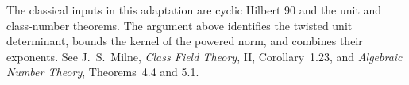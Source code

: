 The classical inputs in this adaptation are cyclic Hilbert 90 and
the unit and class-number theorems. The argument above identifies the
twisted unit determinant, bounds the kernel of the powered norm, and
combines their exponents. See J.~S.~Milne, \emph{Class Field Theory},
II, Corollary~1.23, and \emph{Algebraic Number Theory}, Theorems~4.4
and 5.1. \cite{r21-cft}\quad
\cite{r21-ant}
